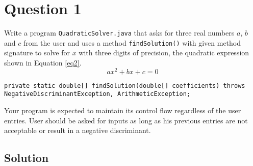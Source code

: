 \section*{Question 1}

Write a program \texttt{QuadraticSolver.java} that asks for three real numbers $a$, $b$ and $c$ from the user and uses a method \texttt{findSolution()} with given method signature to solve for $x$ with three digits of precision, the quadratic expression shown in Equation \ref{eq2}.
\begin{equation}
ax^2+bx+c=0
\label{eq2}
\end{equation}

\lstset{language=java,tabsize=2,numbers=none}
\begin{lstlisting}
private static double[] findSolution(double[] coefficients) throws NegativeDiscriminantException, ArithmeticException;
\end{lstlisting}

Your program is expected to maintain its control flow regardless of the user entries. User should be asked for inputs as long as his previous entries are not acceptable or result in a negative discriminant.

\subsection*{Solution}

